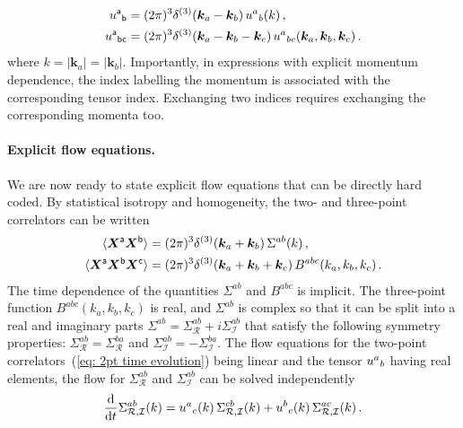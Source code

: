 \documentclass[11pt]{article}
\numberwithin{equation}{section} %
\def \d {\mathrm{d}}
\def \Re {\mathcal{R}}
\def \Im {\mathcal{I}}
\begin{document}
\begin{equation}
    \begin{aligned}
    \tensor{u}{^{\mathsf{a}}}{_{\mathsf{b}}} &= (2\pi)^3\delta^{(3)}(\bm{k}_a - \bm{k}_b)\,\tensor{u}{^{a}}{_{b}}(k)\,,\\
    \tensor{u}{^{\mathsf{a}}}{_{\mathsf{bc}}} &= (2\pi)^3\delta^{(3)}(\bm{k}_a - \bm{k}_b - \bm{k}_c)\,\tensor{u}{^{a}}{_{bc}}(\bm{k}_a, \bm{k}_b, \bm{k}_c)\,.
    \end{aligned}
\end{equation}
where $k = |\bm{k}_a| = |\bm{k}_b|$. Importantly,  in expressions with explicit momentum dependence, the
index labelling the momentum is associated with the corresponding tensor index. Exchanging two indices requires exchanging the corresponding momenta too. 

\paragraph{Explicit flow equations.} We are now ready to state explicit flow equations that can be directly hard coded. By statistical isotropy and homogeneity, the two- and three-point correlators can be written
\begin{equation}
    \begin{aligned}
    \langle \bm{X}^{\sf{a}}\bm{X}^{\sf{b}}\rangle 
    &= (2\pi)^3\delta^{(3)}(\bm{k}_a + \bm{k}_b)\,\Sigma^{ab}(k)\,, \\
    \langle \bm{X}^{\sf{a}} \bm{X}^{\sf{b}} \bm{X}^{\sf{c}}\rangle 
    &= (2\pi)^3\delta^{(3)}(\bm{k}_a + \bm{k}_b + \bm{k}_c)\, B^{abc}(k_a, k_b, k_c)\,.
    \end{aligned}
\end{equation}
The time dependence of the quantities $\Sigma^{ab}$ and $B^{abc}$ is implicit. The three-point function $B^{abc}(k_a, k_b, k_c)$ is real, and $\Sigma^{ab}$ is complex so that it can be split into a real and imaginary parts
$\Sigma^{ab} = \Sigma_{\Re}^{ab} + i \Sigma_{\Im}^{ab}$ that satisfy the following symmetry properties: $\Sigma_{\Re}^{ab} = \Sigma_{\Re}^{ba}$ and $\Sigma_{\Im}^{ab} =- \Sigma_{\Im}^{ba}$. The flow equations for the two-point correlators~(\ref{eq: 2pt time evolution}) being linear and the tensor $\tensor{u}{^{a}}{_{b}}$ having real elements, the flow for $\Sigma_{\Re}^{ab}$ and $\Sigma_{\Im}^{ab}$ can be solved independently
\begin{equation}
\label{eq: explicit 2pt time evolution}
    \frac{\d}{\d t}\Sigma_{\Re, \Im}^{ab}(k) = \tensor{u}{^a}{_c}(k)\, \Sigma_{\Re, \Im}^{cb}(k) + \tensor{u}{^b}{_c}(k)\, \Sigma_{\Re, \Im}^{ac}(k)\,.
\end{equation}
\end{document}
